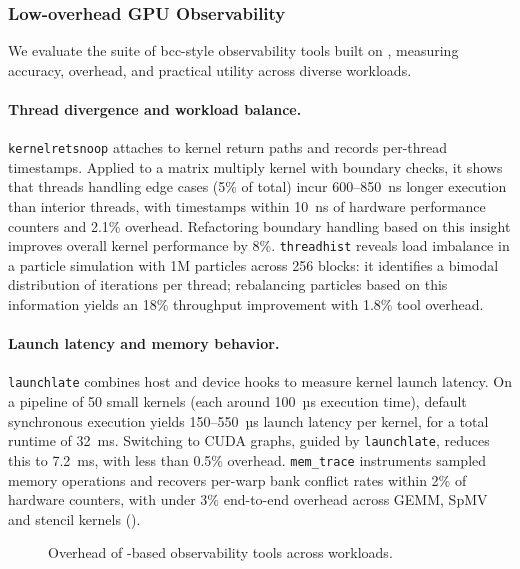 \subsubsection{Low-overhead GPU Observability}

We evaluate the suite of bcc-style observability tools built on \sys, measuring
accuracy, overhead, and practical utility across diverse workloads.

\paragraph{Thread divergence and workload balance.}
\texttt{kernelretsnoop} attaches to kernel return paths and records per-thread
timestamps. Applied to a matrix multiply kernel with boundary checks, it shows
that threads handling edge cases (5\% of total) incur 600--850~ns longer
execution than interior threads, with timestamps within 10~ns of hardware
performance counters and 2.1\% overhead. Refactoring boundary handling based on
this insight improves overall kernel performance by 8\%. \texttt{threadhist}
reveals load imbalance in a particle simulation with 1M particles across 256
blocks: it identifies a bimodal distribution of iterations per thread;
rebalancing particles based on this information yields an 18\% throughput
improvement with 1.8\% tool overhead.

\paragraph{Launch latency and memory behavior.}
\texttt{launchlate} combines host and device hooks to measure kernel launch
latency. On a pipeline of 50 small kernels (each around 100~µs execution time),
default synchronous execution yields 150--550~µs launch latency per kernel, for
a total runtime of 32~ms. Switching to CUDA graphs, guided by
\texttt{launchlate}, reduces this to 7.2~ms, with less than 0.5\% overhead.
\texttt{mem\_trace} instruments sampled memory operations and recovers per-warp
bank conflict rates within 2\% of hardware counters, with under 3\% end-to-end
overhead across GEMM, SpMV and stencil kernels ().

\begin{figure}
\centering
{}
\caption{Overhead of \sys-based observability tools across workloads.}
\label{fig:obs-overhead}
\end{figure}

